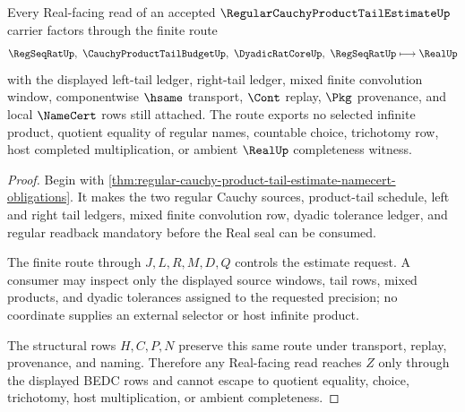 \begin{theorem}
\label{thm:regular-cauchy-product-tail-estimate-real-seal-route}
Every Real-facing read of an accepted $\RegularCauchyProductTailEstimateUp$ carrier factors through the finite route
$$
\RegSeqRatUp,\ \CauchyProductTailBudgetUp,\ \DyadicRatCoreUp,\ \RegSeqRatUp \longmapsto \RealUp
$$
with the displayed left-tail ledger, right-tail ledger, mixed finite convolution window, componentwise $\hsame$ transport, $\Cont$ replay, $\Pkg$ provenance, and local $\NameCert$ rows still attached. The route exports no selected infinite product, quotient equality of regular names, countable choice, trichotomy row, host completed multiplication, or ambient $\RealUp$ completeness witness.
\end{theorem}
\begin{proof}
Begin with \autoref{thm:regular-cauchy-product-tail-estimate-namecert-obligations}. It makes the two regular Cauchy sources, product-tail schedule, left and right tail ledgers, mixed finite convolution row, dyadic tolerance ledger, and regular readback mandatory before the Real seal can be consumed.

The finite route through $J,L,R,M,D,Q$ controls the estimate request. A consumer may inspect only the displayed source windows, tail rows, mixed products, and dyadic tolerances assigned to the requested precision; no coordinate supplies an external selector or host infinite product.

The structural rows $H,C,P,N$ preserve this same route under transport, replay, provenance, and naming. Therefore any Real-facing read reaches $Z$ only through the displayed BEDC rows and cannot escape to quotient equality, choice, trichotomy, host multiplication, or ambient completeness.
\end{proof}



